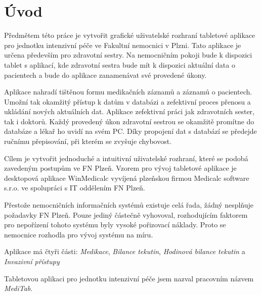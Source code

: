\setlength{\parskip}{1em}

\chapter*{Úvod}

Předmětem této práce je vytvořit grafické uživatelské rozhraní tabletové aplikace pro jednotku intenzivní péče ve Fakultní nemocnici v Plzni. Tato aplikace je určena především pro zdravotní sestry. Na nemocničním pokoji bude k dispozici tablet s aplikací, kde zdravotní sestra bude mít k dispozici aktuální data o pacientech a bude do aplikace zanamenávat své provedené úkony.

Aplikace nahradí tištěnou formu medikačních záznamů a záznamů o pacientech. Umožní tak okamžitý přístup k datům v databázi a zefektivní proces přenosu a ukládání nových aktuálních dat. Aplikace zefektivní práci jak zdravotních sester, tak i doktorů. Každý provedený úkon zdravotní sestrou se okamžitě promítne do databáze a lékař ho uvidí na svém PC. Díky propojení dat s databází se předejde ručnímu přepisování, při kterém se zvyšuje chybovost.

Cílem je vytvořit jednoduché a intuitivní uživatelské rozhraní, které se podobá zavedeným postupům ve FN Plzeň. Vzorem pro vývoj tabletové aplikace je desktopová aplikace WinMedicalc vyvíjená plzeňskou firmou Medicalc software s.r.o. ve spolupráci s IT oddělením FN Plzeň.

Přestože nemocničních informačních systémů existuje celá řada, žádný nesplňuje požadavky FN Plzeň. Pouze jediný částečně vyhovoval, rozhodujícím faktorem pro nepořízení tohoto systému byly vysoké pořizovací náklady. Proto se nemocnice rozhodla pro vývoj systému na míru.

Aplikace má čtyři části: \emph{Medikace}, \emph{Bilance tekutin}, \emph{Hodinová bilance tekutin} a \emph{Invazivní přístupy}

Tabletovou aplikaci pro jednotku intenzivní péče jsem nazval pracovním názvem \emph{MediTab}.